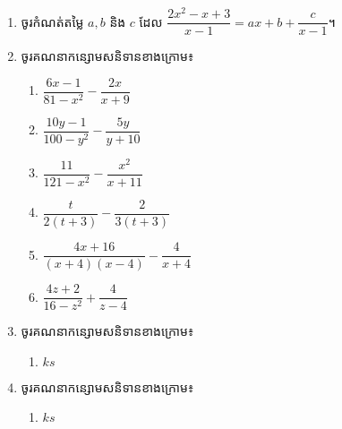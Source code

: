 \begin{enumerate}
\item ចូរកំណត់តម្លៃ $a,b$ និង $c$ ដែល $\dfrac{2x^2-x+3}{x-1}=ax+b+\dfrac{c}{x-1}$។
\item ចូរគណនាកន្សោមសនិទានខាងក្រោម៖
\begin{multicols}{3}
\begin{enumerate}[label=\alph*.]
\item $\dfrac{6x-1}{81-x^2}-\dfrac{2x}{x+9}$
\item $\dfrac{10y-1}{100-y^2}-\dfrac{5y}{y+10}$
\item $\dfrac{11}{121-x^2}-\dfrac{x^2}{x+11}$
\item $\dfrac{t}{2(t+3)}-\dfrac{2}{3(t+3)}$
\item $\dfrac{4x+16}{(x+4)(x-4)}-\dfrac{4}{x+4}$
\item $\dfrac{4z+2}{16-z^2}+\dfrac{4}{z-4}$
\end{enumerate}
\end{multicols}

\item ចូរគណនាកន្សោមសនិទានខាងក្រោម៖
\begin{multicols}{4}
\begin{enumerate}[label=\alph*.]
\item $ks$
\end{enumerate}
\end{multicols}

\item ចូរគណនាកន្សោមសនិទានខាងក្រោម៖
\begin{multicols}{4}
\begin{enumerate}[label=\alph*.]
\item $ks$
\end{enumerate}
\end{multicols}
\end{enumerate}


\newpage
